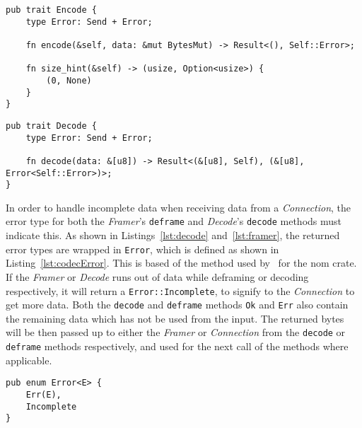 \begin{lstlisting}[float=h, label=lst:encode, caption={The Encode trait, showing the size\_hint method.}]
pub trait Encode {
    type Error: Send + Error;

    fn encode(&self, data: &mut BytesMut) -> Result<(), Self::Error>;

    fn size_hint(&self) -> (usize, Option<usize>) {
        (0, None)
    }
}
\end{lstlisting}

\begin{lstlisting}[float=h, label=lst:decode, caption={The Decode trait.}]
pub trait Decode {
    type Error: Send + Error;

    fn decode(data: &[u8]) -> Result<(&[u8], Self), (&[u8], Error<Self::Error>)>;
}
\end{lstlisting}

In order to handle incomplete data when receiving data from a \emph{Connection}, the error type for both the
\emph{Framer}'s \texttt{deframe} and \emph{Decode}'s \texttt{decode} methods must indicate this.
As shown in Listings~\ref{lst:decode} and~\ref{lst:framer}, the returned error types are wrapped in \texttt{Error},
which is defined as shown in Listing~\ref{lst:codecError}.
This is based of the method used by~\cite{geal_nomerrrust_} for the nom crate.
If the \emph{Framer} or \emph{Decode} runs out of data while deframing or decoding respectively, it will return a
\texttt{Error::Incomplete}, to signify to the \emph{Connection} to get more data.
Both the \texttt{decode} and \texttt{deframe} methods \texttt{Ok} and \texttt{Err} also contain the remaining data which
has not be used from the input.
The returned bytes will be then passed up to either the \emph{Framer} or \emph{Connection} from the \texttt{decode} or
\texttt{deframe} methods respectively, and used for the next call of the methods where applicable.

\begin{lstlisting}[float=h, label=lst:codecError, caption={The Error type for deframe and decode methods,
    showing the Incomplete varient.}]
pub enum Error<E> {
    Err(E),
    Incomplete
}
\end{lstlisting}

